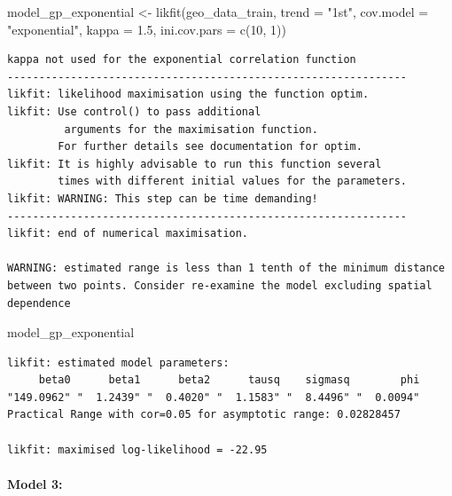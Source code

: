 \documentclass[
  11pt,
]{article}
\makeatletter
\let\oldparagraph\paragraph
\renewcommand{\paragraph}{
    \@ifstar
      \xxxParagraphStar
      \xxxParagraphNoStar
  }
\newcommand{\xxxParagraphStar}[1]{\oldparagraph*{#1}\mbox{}}
\newcommand{\xxxParagraphNoStar}[1]{\oldparagraph{#1}\mbox{}}
\newenvironment{Shaded}{\begin{snugshade}}{\end{snugshade}}
\newcommand{\AttributeTok}[1]{\textcolor[rgb]{0.40,0.45,0.13}{#1}}
\newcommand{\DecValTok}[1]{\textcolor[rgb]{0.68,0.00,0.00}{#1}}
\newcommand{\FloatTok}[1]{\textcolor[rgb]{0.68,0.00,0.00}{#1}}
\newcommand{\FunctionTok}[1]{\textcolor[rgb]{0.28,0.35,0.67}{#1}}
\newcommand{\NormalTok}[1]{\textcolor[rgb]{0.00,0.23,0.31}{#1}}
\newcommand{\OtherTok}[1]{\textcolor[rgb]{0.00,0.23,0.31}{#1}}
\newcommand{\StringTok}[1]{\textcolor[rgb]{0.13,0.47,0.30}{#1}}
\makeatother
\begin{document}
\begin{Shaded}
\begin{Highlighting}[]
\NormalTok{model\_gp\_exponential }\OtherTok{\textless{}{-}} \FunctionTok{likfit}\NormalTok{(geo\_data\_train, }\AttributeTok{trend =} \StringTok{"1st"}\NormalTok{, }\AttributeTok{cov.model =} \StringTok{"exponential"}\NormalTok{, }\AttributeTok{kappa =} \FloatTok{1.5}\NormalTok{, }\AttributeTok{ini.cov.pars =} \FunctionTok{c}\NormalTok{(}\DecValTok{10}\NormalTok{, }\DecValTok{1}\NormalTok{))}
\end{Highlighting}
\end{Shaded}

\begin{verbatim}
kappa not used for the exponential correlation function
---------------------------------------------------------------
likfit: likelihood maximisation using the function optim.
likfit: Use control() to pass additional
         arguments for the maximisation function.
        For further details see documentation for optim.
likfit: It is highly advisable to run this function several
        times with different initial values for the parameters.
likfit: WARNING: This step can be time demanding!
---------------------------------------------------------------
likfit: end of numerical maximisation.

WARNING: estimated range is less than 1 tenth of the minimum distance between two points. Consider re-examine the model excluding spatial dependence
\end{verbatim}

\begin{Shaded}
\begin{Highlighting}[]
\NormalTok{model\_gp\_exponential}
\end{Highlighting}
\end{Shaded}

\begin{verbatim}
likfit: estimated model parameters:
     beta0      beta1      beta2      tausq    sigmasq        phi 
"149.0962" "  1.2439" "  0.4020" "  1.1583" "  8.4496" "  0.0094" 
Practical Range with cor=0.05 for asymptotic range: 0.02828457

likfit: maximised log-likelihood = -22.95
\end{verbatim}

\paragraph{\texorpdfstring{\textbf{Model 3:}}{Model 3:}}\label{model-3}
\end{document}

